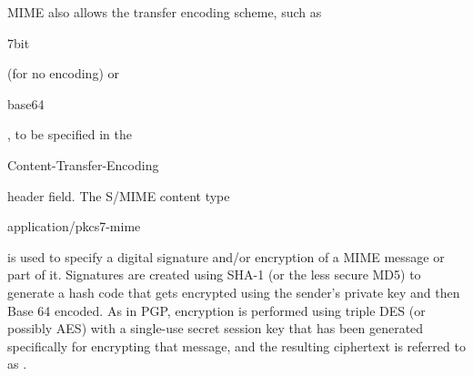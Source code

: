 MIME also allows the transfer encoding scheme, such as \begin{code}7bit\end{code}
(for no encoding) or \begin{code}base64\end{code},
to be specified in the \begin{code}Content-Transfer-Encoding\end{code} header field.
The S/MIME content type \begin{code}application/pkcs7-mime\end{code} is used to
specify a digital signature and/or encryption of a MIME message or part of it.
Signatures are created using SHA-1 (or the less secure MD5) to generate a hash code that
gets encrypted using the sender's private key and then Base 64 encoded.
As in PGP, encryption is performed using triple DES (or possibly AES) with a single-use secret
session key that has been generated specifically for encrypting that message,
and the resulting ciphertext is referred to as .


